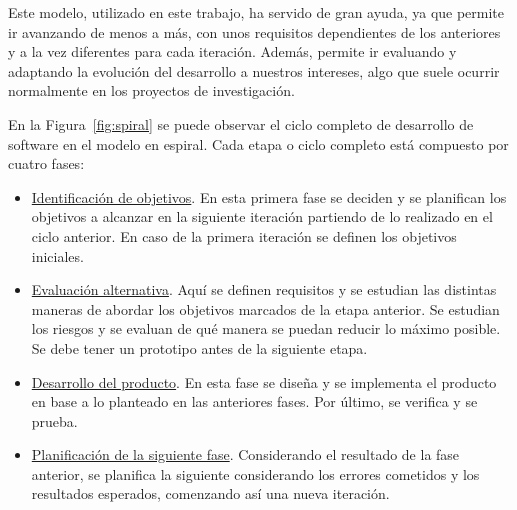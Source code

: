 Este modelo, utilizado en este trabajo, ha servido de gran ayuda, ya que permite ir avanzando de menos a más, con unos requisitos dependientes de los anteriores y a la vez diferentes para cada iteración. Además, permite ir evaluando y adaptando la evolución del desarrollo a nuestros intereses, algo que suele ocurrir normalmente en los proyectos de investigación.

En la Figura~\ref{fig:spiral} se puede observar el ciclo completo de desarrollo de software en el modelo en espiral. Cada etapa o ciclo completo está compuesto por cuatro fases:

\begin{itemize}
\item \underline{Identificación de objetivos}. En esta primera fase se deciden y se planifican los objetivos a alcanzar en la siguiente iteración partiendo de lo realizado en el ciclo anterior. En caso de la primera iteración se definen los objetivos iniciales.

\item \underline{Evaluación alternativa}. Aquí se definen requisitos y se estudian las distintas maneras de abordar los objetivos marcados de la etapa anterior. Se estudian los riesgos y se evaluan de qué manera se puedan reducir lo máximo posible. Se debe tener un prototipo antes de la siguiente etapa.

\item \underline{Desarrollo del producto}. En esta fase se diseña y se implementa el producto en base a lo planteado en las anteriores fases. Por último, se verifica y se prueba.

\item \underline{Planificación de la siguiente fase}. Considerando el resultado de la fase anterior, se planifica la siguiente considerando los errores cometidos y los resultados esperados, comenzando así una nueva iteración.

\end{itemize}

